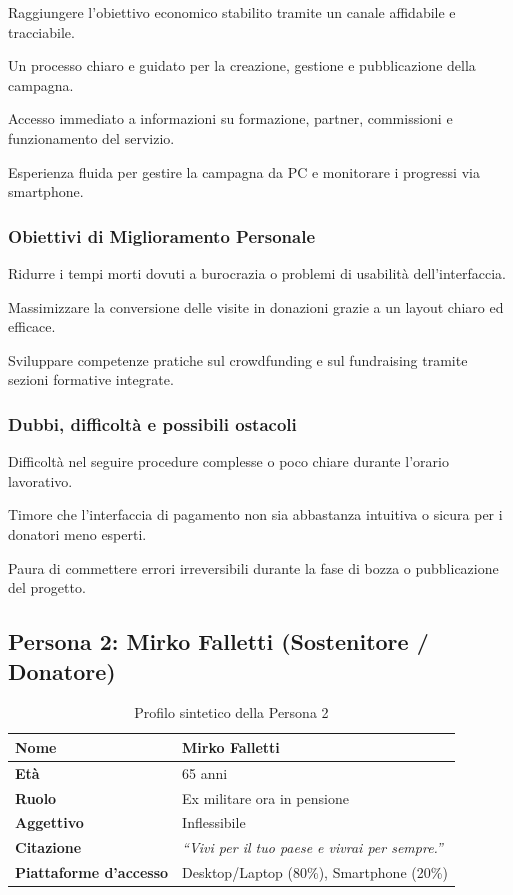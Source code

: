 \documentclass[11pt,a4paper]{article}
\begin{document}
Raggiungere l'obiettivo economico stabilito tramite un canale affidabile e tracciabile.

Un processo chiaro e guidato per la creazione, gestione e pubblicazione della campagna.

Accesso immediato a informazioni su formazione, partner, commissioni e funzionamento del servizio.

Esperienza fluida per gestire la campagna da PC e monitorare i progressi via smartphone.

\subsubsection{Obiettivi di Miglioramento Personale}

Ridurre i tempi morti dovuti a burocrazia o problemi di usabilità dell'interfaccia.

Massimizzare la conversione delle visite in donazioni grazie a un layout chiaro ed efficace.

Sviluppare competenze pratiche sul crowdfunding e sul fundraising tramite sezioni formative integrate.

\subsubsection{Dubbi, difficoltà e possibili ostacoli}

Difficoltà nel seguire procedure complesse o poco chiare durante l'orario lavorativo.

Timore che l'interfaccia di pagamento non sia abbastanza intuitiva o sicura per i donatori meno esperti.

Paura di commettere errori irreversibili durante la fase di bozza o pubblicazione del progetto.


\subsection{Persona 2: Mirko Falletti (Sostenitore / Donatore)}
\label{subsec:persona2}

\begin{table}[h!]
\centering
\small
\begin{tabular}{|p{3.5cm}|p{11.5cm}|}
\hline
\textbf{Nome} & Mirko Falletti \\ \hline
\textbf{Età} & 65 anni \\ \hline
\textbf{Ruolo} & Ex militare ora in pensione \\ \hline
\textbf{Aggettivo} & Inflessibile \\ \hline
\textbf{Citazione} & \textit{``Vivi per il tuo paese e vivrai per sempre.''} \\ \hline
\textbf{Piattaforme d'accesso} & Desktop/Laptop (80\%), Smartphone (20\%) \\ \hline
\end{tabular}
\caption{Profilo sintetico della Persona 2}
\label{tab:persona2}
\end{table}
\end{document}
